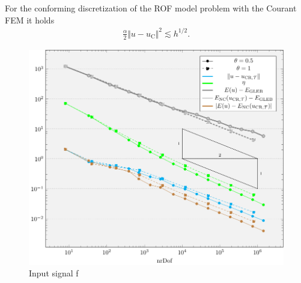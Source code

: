 \begin{frame}
  \pause
  \vspace{-0.5cm}
  \begin{block}{\cite[p. 309, Thm. 10.7]{Bar15}}
    For the conforming discretization of the ROF model problem with the 
    Courant FEM it holds
    \begin{align*}
      \frac{\alpha}{2}\Vert u-u_\text{C}\Vert^2\lesssim h^{1/2}. 
    \end{align*}
  \end{block}
\end{frame}

\begin{frame}
  \begin{figure}[!ht]
    \centering
    \caption*{Input signal f}
    \includegraphics[width=0.8\linewidth]
        {pictures/experiments/refIndGlebConvergence/f01/convergenceEtaErrorGleb.pdf}
  \end{figure}
\end{frame}

